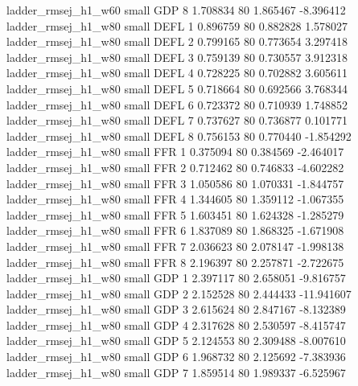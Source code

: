      ladder_rmsej_h1_w60      small      GDP                 8 1.708834 80       1.865467          -8.396412
     ladder_rmsej_h1_w80      small     DEFL                 1 0.896759 80       0.882828           1.578027
     ladder_rmsej_h1_w80      small     DEFL                 2 0.799165 80       0.773654           3.297418
     ladder_rmsej_h1_w80      small     DEFL                 3 0.759139 80       0.730557           3.912318
     ladder_rmsej_h1_w80      small     DEFL                 4 0.728225 80       0.702882           3.605611
     ladder_rmsej_h1_w80      small     DEFL                 5 0.718664 80       0.692566           3.768344
     ladder_rmsej_h1_w80      small     DEFL                 6 0.723372 80       0.710939           1.748852
     ladder_rmsej_h1_w80      small     DEFL                 7 0.737627 80       0.736877           0.101771
     ladder_rmsej_h1_w80      small     DEFL                 8 0.756153 80       0.770440          -1.854292
     ladder_rmsej_h1_w80      small      FFR                 1 0.375094 80       0.384569          -2.464017
     ladder_rmsej_h1_w80      small      FFR                 2 0.712462 80       0.746833          -4.602282
     ladder_rmsej_h1_w80      small      FFR                 3 1.050586 80       1.070331          -1.844757
     ladder_rmsej_h1_w80      small      FFR                 4 1.344605 80       1.359112          -1.067355
     ladder_rmsej_h1_w80      small      FFR                 5 1.603451 80       1.624328          -1.285279
     ladder_rmsej_h1_w80      small      FFR                 6 1.837089 80       1.868325          -1.671908
     ladder_rmsej_h1_w80      small      FFR                 7 2.036623 80       2.078147          -1.998138
     ladder_rmsej_h1_w80      small      FFR                 8 2.196397 80       2.257871          -2.722675
     ladder_rmsej_h1_w80      small      GDP                 1 2.397117 80       2.658051          -9.816757
     ladder_rmsej_h1_w80      small      GDP                 2 2.152528 80       2.444433         -11.941607
     ladder_rmsej_h1_w80      small      GDP                 3 2.615624 80       2.847167          -8.132389
     ladder_rmsej_h1_w80      small      GDP                 4 2.317628 80       2.530597          -8.415747
     ladder_rmsej_h1_w80      small      GDP                 5 2.124553 80       2.309488          -8.007610
     ladder_rmsej_h1_w80      small      GDP                 6 1.968732 80       2.125692          -7.383936
     ladder_rmsej_h1_w80      small      GDP                 7 1.859514 80       1.989337          -6.525967
